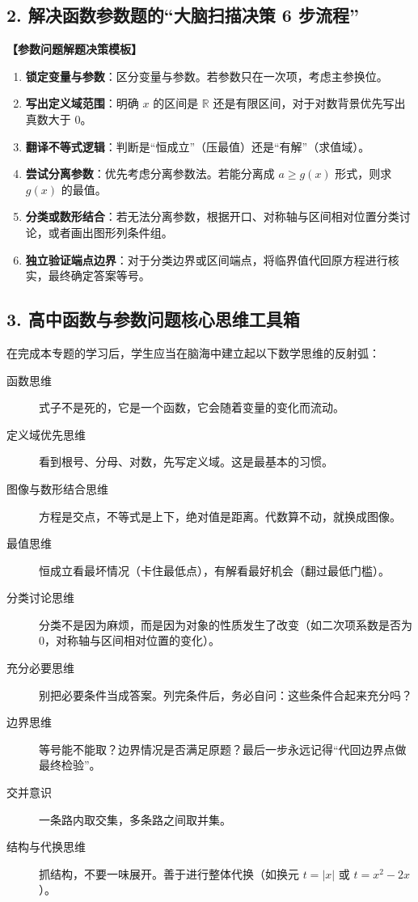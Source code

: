 \documentclass[11pt,a4paper]{ctexart}
\begin{document}
\subsection{2. 解决函数参数题的“大脑扫描决策 6 步流程”}

\begin{center}
\begin{tcolorbox}[colback=white, colframe=black, boxrule=0.5pt, arc=0pt, left=8pt, right=8pt, top=8pt, bottom=8pt]
\textbf{【参数问题解题决策模板】}
\begin{enumerate}[label=第\arabic*步：, leftmargin=3.5em]
  \item \textbf{锁定变量与参数}：区分变量与参数。若参数只在一次项，考虑主参换位。
  \item \textbf{写出定义域范围}：明确 $x$ 的区间是 $\mathbb R$ 还是有限区间，对于对数背景优先写出真数大于 0。
  \item \textbf{翻译不等式逻辑}：判断是“恒成立”（压最值）还是“有解”（求值域）。
  \item \textbf{尝试分离参数}：优先考虑分离参数法。若能分离成 $a \ge g(x)$ 形式，则求 $g(x)$ 的最值。
  \item \textbf{分类或数形结合}：若无法分离参数，根据开口、对称轴与区间相对位置分类讨论，或者画出图形列条件组。
  \item \textbf{独立验证端点边界}：对于分类边界或区间端点，将临界值代回原方程进行核实，最终确定答案等号。
\end{enumerate}
\end{tcolorbox}
\end{center}

\subsection{3. 高中函数与参数问题核心思维工具箱}
在完成本专题的学习后，学生应当在脑海中建立起以下数学思维的反射弧：
\begin{description}
  \item[函数思维] 式子不是死的，它是一个函数，它会随着变量的变化而流动。
  \item[定义域优先思维] 看到根号、分母、对数，先写定义域。这是最基本的习惯。
  \item[图像与数形结合思维] 方程是交点，不等式是上下，绝对值是距离。代数算不动，就换成图像。
  \item[最值思维] 恒成立看最坏情况（卡住最低点），有解看最好机会（翻过最低门槛）。
  \item[分类讨论思维] 分类不是因为麻烦，而是因为对象的性质发生了改变（如二次项系数是否为0，对称轴与区间相对位置的变化）。
  \item[充分必要思维] 别把必要条件当成答案。列完条件后，务必自问：这些条件合起来充分吗？
  \item[边界思维] 等号能不能取？边界情况是否满足原题？最后一步永远记得“代回边界点做最终检验”。
  \item[交并意识] 一条路内取交集，多条路之间取并集。
  \item[结构与代换思维] 抓结构，不要一味展开。善于进行整体代换（如换元 $t = |x|$ 或 $t = x^2-2x$）。
\end{description}
\end{document}
